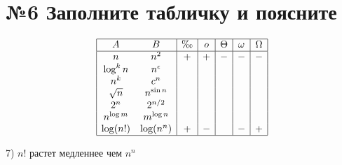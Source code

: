 
\section*{№6 Заполните табличку и поясните}
$$
    \begin{array}{|cc|c|c|c|c|c|}
      \hline
      A & B & \O & o & \Theta & \omega & \Omega \\
      \hline
      n & n^2 & + & + & - & - & - \\
      \log^k n & n^{\epsilon} & & & & & \\
      n^k & c^n & & & & & \\
      \sqrt{n} & n^{\sin n} & & & & & \\
      2^n & 2^{n \slash 2} & & & & & \\
      n^{\log m} & m^{\log n} & & & & & \\
      \log (n!) & \log(n^n) & + &- & & -&+ \\
      \hline
    \end{array}
$$

7) $n!$ растет медленнее чем $n^n$